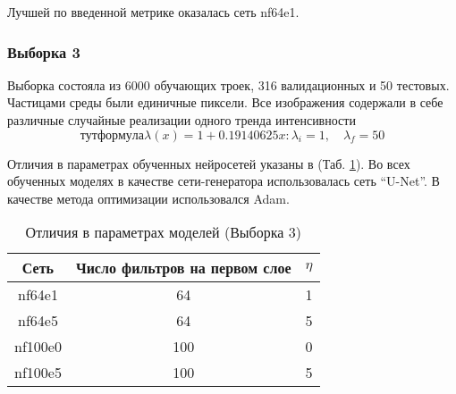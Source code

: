 			Лучшей по введенной метрике оказалась сеть nf64e1.
		\subsubsection{Выборка 3}
			Выборка состояла из 6000 обучающих троек, 316 валидационных и 50 тестовых. Частицами среды были единичные пиксели. Все изображения содержали в себе различные случайные реализации одного тренда интенсивности
			$$тут формула \lambda(x) = 1 + 0.19140625x: \lambda_i = 1, \quad \lambda_f = 50$$
			
			Отличия в параметрах обученных нейросетей указаны в (Таб. \ref{8-dust-trend1-nns}). Во всех обученных моделях в качестве сети-генератора использовалась сеть ``U-Net''. В качестве метода оптимизации использовался Adam.
			
			\begin{table}[h!]
				\begin{center}
					\begin{tabular}{|c|c|c|}
						\hline
						Сеть & Число фильтров на первом слое & $\eta$ \\
						\hline
						nf64e1 & 64 & 1 \\
						\hline
						nf64e5 & 64 & 5 \\
						\hline
						nf100e0 & 100 & 0 \\
						\hline
						nf100e5 & 100 & 5 \\
						\hline
					\end{tabular}
					\caption{Отличия в параметрах моделей (Выборка 3)}
					\label{8-dust-trend1-nns}
				\end{center}
			\end{table}
			
